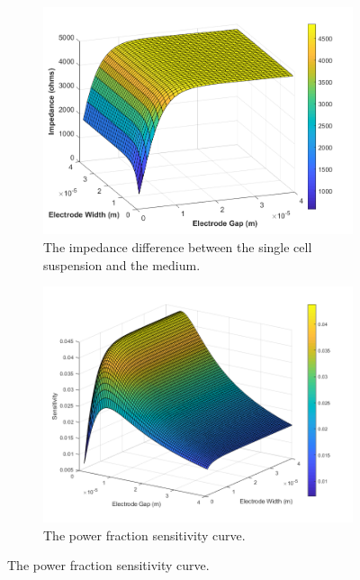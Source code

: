 \begin{figure}[h]
    \centering
    \begin{subfigure}[b]{0.49\textwidth}
        \centering
        \includegraphics[width=\textwidth]{images/analytic_sun_difference_expanded.png}
        \caption{The impedance difference between the single cell suspension and the medium.}
    \end{subfigure}
    \hfill
    \begin{subfigure}[b]{0.49\textwidth}
        \centering
        \includegraphics[width=\textwidth]{images/expandedPowerSensitivity.png}
        \caption{The power fraction sensitivity curve. \\ \vspace{0.15 in}}

\end{subfigure}
\end{figure}
